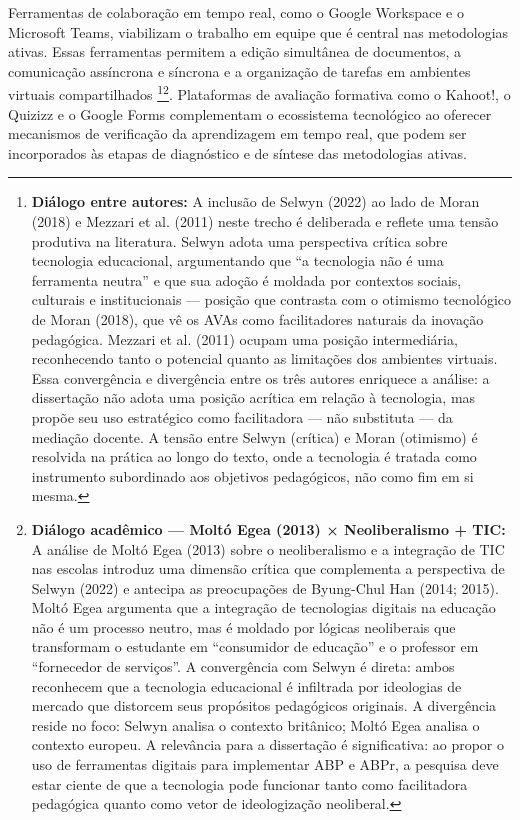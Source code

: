 Ferramentas de colaboração em tempo real, como o Google Workspace e o Microsoft Teams, viabilizam o trabalho em equipe que é central nas metodologias ativas. Essas ferramentas permitem a edição simultânea de documentos, a comunicação assíncrona e síncrona e a organização de tarefas em ambientes virtuais compartilhados \cite{SELWYN2022, MOLTOEGEA2013}\footnote{\textbf{Diálogo entre autores:} A inclusão de Selwyn (2022) ao lado de Moran (2018) e Mezzari et al. (2011) neste trecho é deliberada e reflete uma tensão produtiva na literatura. Selwyn adota uma perspectiva crítica sobre tecnologia educacional, argumentando que ``a tecnologia não é uma ferramenta neutra'' e que sua adoção é moldada por contextos sociais, culturais e institucionais — posição que contrasta com o otimismo tecnológico de Moran (2018), que vê os AVAs como facilitadores naturais da inovação pedagógica. Mezzari et al. (2011) ocupam uma posição intermediária, reconhecendo tanto o potencial quanto as limitações dos ambientes virtuais. Essa convergência e divergência entre os três autores enriquece a análise: a dissertação não adota uma posição acrítica em relação à tecnologia, mas propõe seu uso estratégico como facilitadora — não substituta — da mediação docente. A tensão entre Selwyn (crítica) e Moran (otimismo) é resolvida na prática ao longo do texto, onde a tecnologia é tratada como instrumento subordinado aos objetivos pedagógicos, não como fim em si mesma.}\footnote{\textbf{Diálogo acadêmico — Moltó Egea (2013) × Neoliberalismo + TIC:} A análise de Moltó Egea (2013) sobre o neoliberalismo e a integração de TIC nas escolas introduz uma dimensão crítica que complementa a perspectiva de Selwyn (2022) e antecipa as preocupações de Byung-Chul Han (2014; 2015). Moltó Egea argumenta que a integração de tecnologias digitais na educação não é um processo neutro, mas é moldado por lógicas neoliberais que transformam o estudante em ``consumidor de educação'' e o professor em ``fornecedor de serviços''. A convergência com Selwyn é direta: ambos reconhecem que a tecnologia educacional é infiltrada por ideologias de mercado que distorcem seus propósitos pedagógicos originais. A divergência reside no foco: Selwyn analisa o contexto britânico; Moltó Egea analisa o contexto europeu. A relevância para a dissertação é significativa: ao propor o uso de ferramentas digitais para implementar ABP e ABPr, a pesquisa deve estar ciente de que a tecnologia pode funcionar tanto como facilitadora pedagógica quanto como vetor de ideologização neoliberal.}. Plataformas de avaliação formativa como o Kahoot!, o Quizizz e o Google Forms complementam o ecossistema tecnológico ao oferecer mecanismos de verificação da aprendizagem em tempo real, que podem ser incorporados às etapas de diagnóstico e de síntese das metodologias ativas.

